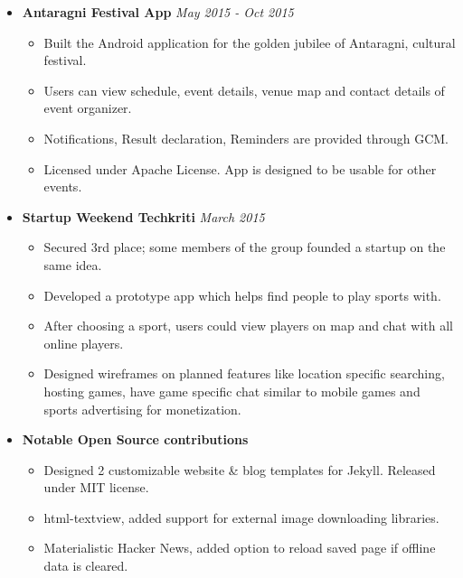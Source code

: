 \documentclass[a4paper]{article}
\begin{document}
\begin{itemize}
\begin{itemize}
	      \end{itemize}
	\item
	      \textbf{Antaragni Festival App}
	      \hfill \textit{May 2015 - Oct 2015}
	      \begin{itemize}
	      	\vspace{-2mm} \setlength\itemsep{-0.2em}
	      	\item Built the Android application for the golden jubilee of Antaragni, cultural festival.
	      	\item Users can view schedule, event details, venue map and contact details of event organizer.
	      	\item Notifications, Result declaration, Reminders are provided through GCM.
	      	\item Licensed under Apache License. App is designed to be usable for other events.
	      \end{itemize}
	\item
	      \textbf{Startup Weekend  Techkriti}
	      \hfill \textit{March 2015}
	      \begin{itemize}
	      	\vspace{-2mm} \setlength\itemsep{-0.2em}
	      	\item Secured 3rd place; some members of the group founded a startup on the same idea.
	      	\item Developed a prototype app which helps find people to play sports with.
	      	\item After choosing a sport, users could view players on map and chat with all online players.
	      	\item Designed wireframes on planned features like location specific searching, hosting games, have game specific chat similar to mobile games and sports advertising for monetization.
	      \end{itemize}
	\item
	      \textbf{Notable Open Source contributions}
	      \begin{itemize}
	      	\vspace{-2mm} \setlength\itemsep{-0.2em}
	      	\item Designed 2 customizable website \& blog templates for Jekyll. Released under MIT license.
	      	\item html-textview, added support for external image downloading libraries.
	      	\item Materialistic Hacker News, added option to reload saved page if offline data is cleared.
	      \end{itemize}
\end{itemize}
\end{document}
